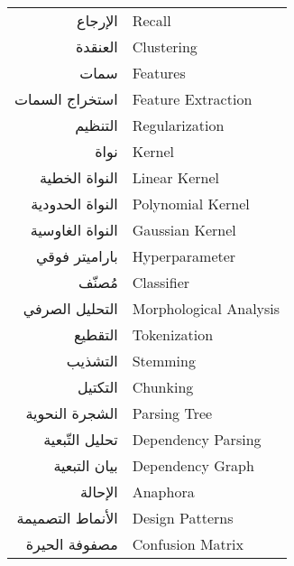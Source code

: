 \begin{doublespacing}
\begin{center}
\begin{longtable}{r l}
			الإرجاع			& 			\textenglish{Recall}				\\
			
			
			العنقدة			& 			\textenglish{Clustering}				\\
			
			
			سمات			& 				\textenglish{Features}				\\
			
			
			استخراج السمات		& 				\textenglish{Feature Extraction}				\\
			
			
			التنظيم		& 			\textenglish{Regularization}	\\
			
			
			نواة		& 			\textenglish{Kernel}	\\
			
			النواة الخطية		& 			\textenglish{Linear Kernel}		\\
			
			النواة الحدودية		& 			\textenglish{Polynomial Kernel}		\\
			
			النواة الغاوسية		& 			\textenglish{Gaussian Kernel}		\\
			
			باراميتر فوقي		& 			\textenglish{Hyperparameter}		\\
			
			مُصنّف	& 			\textenglish{Classifier}		\\
			
			التحليل الصرفي	& 			\textenglish{Morphological Analysis}		\\
			
			التقطيع		& 			\textenglish{Tokenization}		\\
			
			التشذيب	& 			\textenglish{Stemming}		\\
			
			التكتيل		& 			\textenglish{Chunking}		\\
			
			الشجرة النحوية		& 			\textenglish{Parsing Tree}		\\
			
			تحليل التّبعية		& 			\textenglish{Dependency Parsing}		\\
			
			بيان التبعية		& 			\textenglish{Dependency Graph}		\\
			
			الإحالة		& 			\textenglish{Anaphora}		\\
			
			الأنماط التصميمة		& 			\textenglish{Design Patterns}		\\
			
			مصفوفة الحيرة		& 			\textenglish{Confusion Matrix}		\\
			
		\end{longtable}
	\end{center}
\end{doublespacing}

